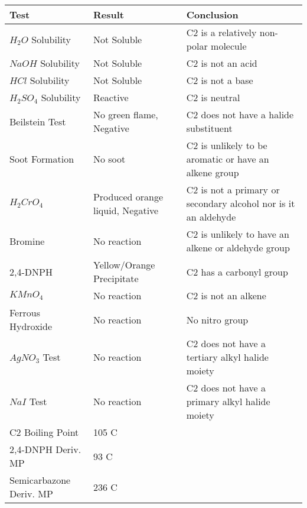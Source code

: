 \documentclass[11pt]{article}
\begin{document}
	\begin{table}[h]
		\raggedright
		\begin{tabular}{ l  p{3.0cm} p{5.4cm} } 
			\toprule
			\textbf{Test} & \textbf{Result} & \textbf{Conclusion} \\\midrule
			
			$H_2O$ Solubility & Not Soluble & C2 is a relatively non-polar molecule \\\hline
			
			$NaOH$ Solubility & Not Soluble & C2 is not an acid \\\hline
			
			$HCl$ Solubility & Not Soluble & C2 is not a base  \\\hline
			
			$H_2SO_4$ Solubility & Reactive & C2 is neutral \\\hline
			
			Beilstein Test & No green flame, Negative & C2 does not have a halide substituent \\\hline
			
			Soot Formation & No soot & C2 is unlikely to be aromatic or have an alkene group \\\hline
			
			$H_2CrO_4$ & Produced orange liquid, Negative & C2 is not a primary or secondary alcohol nor is it an aldehyde \\\hline
			
			Bromine & No reaction & C2 is unlikely to have an alkene or aldehyde group \\\hline 
			
			2,4-DNPH & Yellow/Orange Precipitate & C2 has a carbonyl group \\\hline 
			
			$KMnO_4$ & No reaction & C2 is not an alkene \\\hline 
			
			Ferrous Hydroxide & No reaction & No nitro group \\\hline 
			
			$AgNO_3$ Test & No reaction & C2 does not have a tertiary alkyl halide moiety \\\hline 
			
			$NaI$ Test & No reaction & C2 does not have a primary alkyl halide moiety \\\hline 
			
			C2 Boiling Point & 105 C &  \\\hline
			
			2,4-DNPH Deriv. MP & 93 C &  \\\hline
			
			Semicarbazone Deriv. MP & 236 C &  \\\hline
			
			
			
		\end{tabular}
	\end{table}
	\pagebreak
\end{document}
